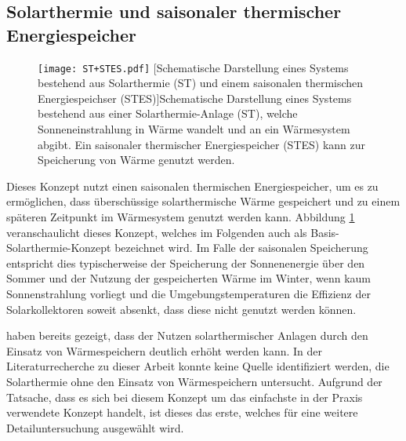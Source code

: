 \subsection*{Solarthermie und saisonaler thermischer Energiespeicher}
	\begin{figure}[ht]
		\centering
		\texttt{[image: ST+STES.pdf]}
		[Schematische Darstellung eines Systems bestehend aus Solarthermie (ST) und einem saisonalen thermischen Energiespeichser (STES)]{Schematische Darstellung eines Systems bestehend aus einer Solarthermie-Anlage (ST), welche Sonneneinstrahlung in Wärme wandelt und an ein Wärmesystem abgibt. Ein saisonaler thermischer Energiespeicher (STES) kann zur Speicherung von Wärme genutzt werden.}
		\label{fig: ST+STES}
	\end{figure}
Dieses Konzept nutzt einen saisonalen thermischen Energiespeicher, um es zu ermöglichen, dass überschüssige solarthermische Wärme gespeichert und zu einem späteren Zeitpunkt im Wärmesystem genutzt werden kann. Abbildung \ref{fig: ST+STES} veranschaulicht dieses Konzept, welches im Folgenden auch als Basis-Solarthermie-Konzept bezeichnet wird.
Im Falle der saisonalen Speicherung entspricht dies typischerweise der Speicherung der Sonnenenergie über den Sommer und der Nutzung der gespeicherten Wärme im Winter, wenn kaum Sonnenstrahlung vorliegt und die Umgebungstemperaturen die Effizienz der Solarkollektoren soweit absenkt, dass diese nicht genutzt werden können.

\citet{CARPANETO2015714} haben bereits gezeigt, dass der Nutzen solarthermischer Anlagen durch den Einsatz von Wärmespeichern deutlich erhöht werden kann. In der Literaturrecherche zu dieser Arbeit konnte keine Quelle identifiziert werden, die Solarthermie ohne den Einsatz von Wärmespeichern untersucht. Aufgrund der Tatsache, dass es sich bei diesem Konzept um das einfachste in der Praxis verwendete Konzept handelt, ist dieses das erste, welches für eine weitere Detailuntersuchung ausgewählt wird. 


